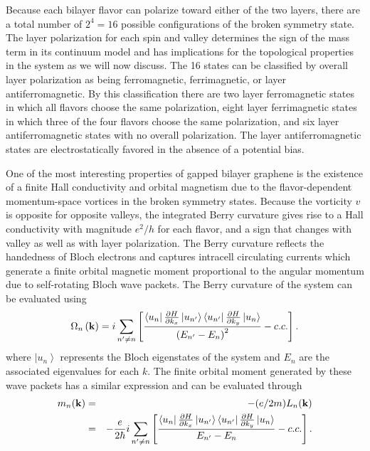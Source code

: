 \documentclass[twocolumn,prb,showpacs,preprintnumbers,amsmath,amssymb]{revtex4}
\begin{document}
Because each bilayer flavor 
can polarize toward either of the two layers, there are a total number of $2^4 = 16$ possible configurations
of the broken symmetry\cite{valleycoherence} state.
The layer polarization for each spin and valley determines the sign of the mass term
in its continuum model and has implications for the topological properties in the system as we will now discuss.
The 16 states can be classified\cite{pmag} by overall layer polarization as being 
ferromagnetic, ferrimagnetic, or layer antiferromagnetic.  By this classification\cite{pmag} there are two layer ferromagnetic states 
in which all flavors choose the same polarization, eight layer ferrimagnetic states in which
three of the four flavors choose the same polarization, and six layer antiferromagnetic states 
with no overall polarization.\cite{xiaofan}  The layer antiferromagnetic states are electrostatically favored in the absence of a potential bias. 

One of the most interesting properties of gapped bilayer graphene is the existence of a finite 
Hall conductivity and orbital magnetism due to the flavor-dependent momentum-space vortices\cite{nandkishore2,xiao,xiaofan} 
in the broken symmetry states.  Because the vorticity $v$ is opposite for opposite valleys,
the integrated Berry curvature gives rise to a Hall conductivity\cite{tknn,mingche,niureview,NagaosaReview} with magnitude 
$e^2/h$ for each flavor, 
and a sign that changes with valley as well as with layer polarization.
The Berry curvature reflects the handedness of Bloch electrons and captures 
intracell circulating currents which generate a finite
orbital magnetic moment 
proportional to the angular momentum 
due to self-rotating Bloch wave packets.\cite{mingche}
The Berry curvature of the system can be evaluated using\cite{niureview} 
\begin{eqnarray*}
\Omega_n \left( {\bf k} \right) = i \sum_{n^{\prime} \neq n} 
\left[ 
\frac{ \left< u_n \right|  \frac{\partial H}{  \partial k_x} \left| u_{n'}\right> 
\left< u_{n'} \right|  \frac{ \partial H}{ \partial k_y} \left| u_{n}\right>}
{ \left( E_{n^{\prime}} - E_{n} \right)^2} 
- c.c. \right]. 
\end{eqnarray*} 
where $\left| u_n \right>$ represents the Bloch eigenstates of the system and $E_n$ are the associated eigenvalues for each $k$.
The finite orbital moment generated by these wave packets has a similar expression and can be evaluated through\cite{niureview} 
\begin{eqnarray*}
m_n({\bf k}) &=& -(e/2m) L_n({\bf k})  \\
&=& -\frac{e}{2 \hbar}  i \sum_{n^{\prime} \neq n} 
\left[ 
\frac{ \left< u_n \right|  \frac{ \partial H}{ \partial k_x} \left| u_{n'}\right> 
\left< u_{n' }\right|  \frac{\partial H}{ \partial k_y} \left| u_{n}\right>}{E_{n^{\prime}} - E_{n} } 
- c.c. \right]. 
\end{eqnarray*}
\end{document}
